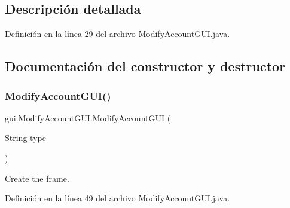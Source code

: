 \subsection{Descripción detallada}


Definición en la línea 29 del archivo Modify\+Account\+G\+U\+I.\+java.



\subsection{Documentación del constructor y destructor}
\mbox{\label{classgui_1_1_modify_account_g_u_i_a6736caf57c7119ae2cdbb68ee38dd7bb}} 
\subsubsection{\texorpdfstring{ModifyAccountGUI()}{ModifyAccountGUI()}}
{\footnotesize\ttfamily gui.\+Modify\+Account\+G\+U\+I.\+Modify\+Account\+G\+UI (\begin{DoxyParamCaption}\item[{String}]{type }\end{DoxyParamCaption})}



Create the frame. 



Definición en la línea 49 del archivo Modify\+Account\+G\+U\+I.\+java.


